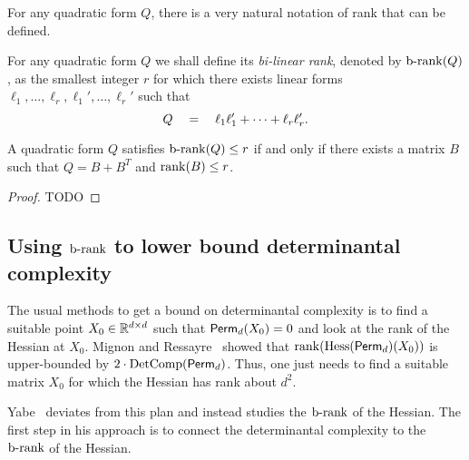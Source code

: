 {\noindent 
For any quadratic form $Q$, there is a very natural notation of rank that can be defined. 

\begin{definition} For any quadratic form $Q$ we shall define its \emph{bi-linear rank}, denoted by $\operatorname{b-rank}(Q)$, as the smallest integer $r$ for which there exists linear forms $\ell_1,\ldots, \ell_r, \ell_1',\ldots,  \ell_r'$ such that 
\[
Q \quad = \quad \ell_1 \ell_1' + \cdots + \ell_r \ell_r'. \qedhere
\]
\end{definition}

\begin{observation}\label{obs:brank-rank}
A quadratic form $Q$ satisfies $\operatorname{b-rank}(Q) \leq r$ if and only if there exists a matrix $B$ such that $Q = B + B^T$ and $\operatorname{rank}(B) \leq r$. 
\end{observation}
\begin{proof}
TODO
\end{proof}

\subsection{Using $\operatorname{b-rank}$ to lower bound determinantal complexity}

The usual methods to get a bound on determinantal complexity is to find a suitable point $X_0 \in \mathbb{R}^{d\times d}$ such that $\operatorname{\mathsf{Perm}}_d(X_0) = 0$ and look at the rank of the Hessian at $X_0$. Mignon and Ressayre~\cite{mr04} showed that $\operatorname{rank}(\operatorname{Hess}(\operatorname{\mathsf{Perm}}_d)(X_0))$ is upper-bounded by $2\cdot \operatorname{DetComp}(\operatorname{\mathsf{Perm}}_d)$. Thus, one just needs to find a suitable matrix $X_0$ for which the Hessian has rank about $d^2$. 

Yabe~\cite{Yabe15} deviates from this plan and instead studies the $\operatorname{b-rank}$ of the Hessian. The first step in his approach is to connect the determinantal complexity to the $\operatorname{b-rank}$ of the Hessian. 


}
